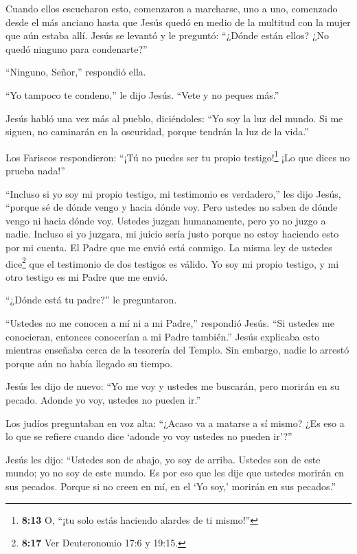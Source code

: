  Cuando ellos escucharon esto, comenzaron a marcharse, uno a
uno, comenzado desde el más anciano hasta que Jesús quedó en medio de la
multitud con la mujer que aún estaba allí.  Jesús se
levantó y le preguntó: ``¿Dónde están ellos? ¿No quedó ninguno para
condenarte?''

 ``Ninguno, Señor,'' respondió ella.

``Yo tampoco te condeno,'' le dijo Jesús. ``Vete y no peques más.''

 Jesús habló una vez más al pueblo, diciéndoles: ``Yo soy
la luz del mundo. Si me siguen, no caminarán en la oscuridad, porque
tendrán la luz de la vida.''

 Los Fariseos respondieron: ``¡Tú no puedes ser tu propio
testigo!\footnote{\textbf{8:13} O, ``¡tu solo estás haciendo alardes de
  ti mismo!''} ¡Lo que dices no prueba nada!''

 ``Incluso si yo soy mi propio testigo, mi testimonio es
verdadero,'' les dijo Jesús, ``porque sé de dónde vengo y hacia dónde
voy. Pero ustedes no saben de dónde vengo ni hacia dónde voy.
 Ustedes juzgan humanamente, pero yo no juzgo a nadie.
 Incluso si yo juzgara, mi juicio sería justo porque no
estoy haciendo esto por mi cuenta. El Padre que me envió está conmigo.
 La misma ley de ustedes dice\footnote{\textbf{8:17} Ver
  Deuteronomio 17:6 y 19:15.} que el testimonio de dos testigos es
válido.  Yo soy mi propio testigo, y mi otro testigo es mi
Padre que me envió.

 ``¿Dónde está tu padre?'' le preguntaron.

``Ustedes no me conocen a mí ni a mi Padre,'' respondió Jesús. ``Si
ustedes me conocieran, entonces conocerían a mi Padre también.''
 Jesús explicaba esto mientras enseñaba cerca de la
tesorería del Templo. Sin embargo, nadie lo arrestó porque aún no había
llegado su tiempo.

 Jesús les dijo de nuevo: ``Yo me voy y ustedes me
buscarán, pero morirán en su pecado. Adonde yo voy, ustedes no pueden
ir.''

 Los judíos preguntaban en voz alta: ``¿Acaso va a matarse
a sí mismo? ¿Es eso a lo que se refiere cuando dice `adonde yo voy
ustedes no pueden ir'?''

 Jesús les dijo: ``Ustedes son de abajo, yo soy de arriba.
Ustedes son de este mundo; yo no soy de este mundo.  Es por
eso que les dije que ustedes morirán en sus pecados. Porque si no creen
en mí, en el `Yo soy,' morirán en sus pecados.''

